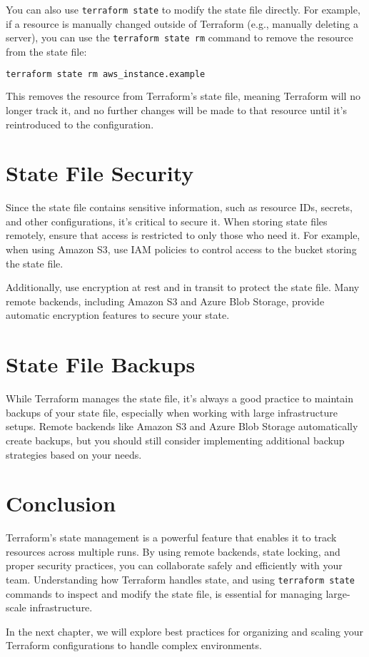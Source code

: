 You can also use \texttt{terraform state} to modify the state file directly. For example, if a resource is manually changed outside of Terraform (e.g., manually deleting a server), you can use the \texttt{terraform state rm} command to remove the resource from the state file:

\begin{lstlisting}[language=bash]
terraform state rm aws_instance.example
\end{lstlisting}

This removes the resource from Terraform's state file, meaning Terraform will no longer track it, and no further changes will be made to that resource until it's reintroduced to the configuration.

\section{State File Security}

Since the state file contains sensitive information, such as resource IDs, secrets, and other configurations, it's critical to secure it. When storing state files remotely, ensure that access is restricted to only those who need it. For example, when using Amazon S3, use IAM policies to control access to the bucket storing the state file.

Additionally, use encryption at rest and in transit to protect the state file. Many remote backends, including Amazon S3 and Azure Blob Storage, provide automatic encryption features to secure your state.

\section{State File Backups}

While Terraform manages the state file, it's always a good practice to maintain backups of your state file, especially when working with large infrastructure setups. Remote backends like Amazon S3 and Azure Blob Storage automatically create backups, but you should still consider implementing additional backup strategies based on your needs.

\section{Conclusion}

Terraform's state management is a powerful feature that enables it to track resources across multiple runs. By using remote backends, state locking, and proper security practices, you can collaborate safely and efficiently with your team. Understanding how Terraform handles state, and using \texttt{terraform state} commands to inspect and modify the state file, is essential for managing large-scale infrastructure.

In the next chapter, we will explore best practices for organizing and scaling your Terraform configurations to handle complex environments.

